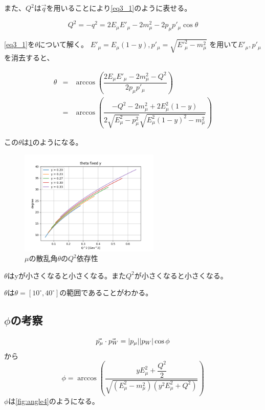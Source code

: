 また、$Q^2$は$\vec{q}$を用いることにより\ref{eq3_1}のように表せる。

\begin{equation}
    \label{eq3_1}
    Q^2 = -q^2 = 2E_\mu E'_\mu -2m^2_\mu-2p_\mu p'_\mu \cos\theta
\end{equation}

\ref{eq3_1}を$\theta$について解く。
$E'_\mu = E_\mu(1-y), p'_\mu = \sqrt{E'^2_\mu - m^2_\mu}$
を用いて$E'_\mu, p'_\mu$を消去すると、

\begin{eqnarray}
    \theta & = &\arccos{(\dfrac {2E_\mu E'_\mu -2m^2_\mu-Q^2}{2p_\mu p'_\mu})} \\
    & = & \arccos{(\dfrac{-Q^2-2m^2_\mu+2E^2_\mu(1-y)}{2\sqrt{E^2_\mu-p^2_\mu}\sqrt{E^2_\mu(1-y)^2-m^2_\mu} } )}
\end{eqnarray}

この$\theta$は\ref{fig:angle3}のようになる。

\begin{figure}[H]
    \centering
    \includegraphics[height=5cm]{img/theta_degree_y_fixed.png}
    \caption{$\mu$の散乱角$\theta$の$Q^2$依存性}
    \label{fig:angle3}
\end{figure}

$\theta$はyが小さくなると小さくなる。また$Q^2$が小さくなると小さくなる。

$\theta$は$\theta=[10^\circ,40^\circ]$の範囲であることがわかる。


\subsection{$\phi$の考察}
\begin{equation}
    \vec{p_\mu} \cdot \vec{p_W} = |p_\mu| |p_W| \\ \cos\phi
\end{equation}
から
\begin{equation}
    \phi = \arccos{(\dfrac{yE^2_\mu + \dfrac{Q^2}{2}} {\sqrt{(E^2_\mu - m^2_\mu)(y^2E^2_\mu+Q^2)}} ) }
\end{equation}
$\phi$は\ref{fig:angle4}のようになる。

